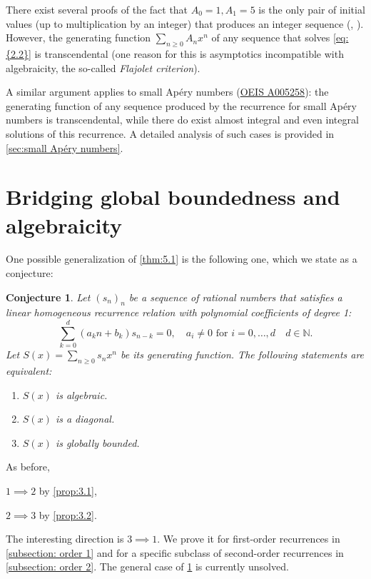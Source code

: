 \documentclass[11pt]{article}
\theoremstyle{definition}
\theoremstyle{plain}
\newtheorem{conj}[defi]{Conjecture}
\theoremstyle{remark}
\begin{document}
There exist several proofs of the fact that $A_0 = 1, A_1 = 5$ is the only pair of initial values (up to multiplication by an integer) that produces an integer sequence (\cite{C84}, \cite{AJ91}). However, the generating function $\sum\limits_{n\geq0}A_nx^n$ of any sequence that solves \eqref{eq:{2.2}} is transcendental (one reason for this is asymptotics incompatible with algebraicity, the so-called \emph{Flajolet criterion}).

A similar argument applies to small Apéry numbers (\href{https://oeis.org/A005258}{OEIS A005258}): the generating function of any sequence produced by the recurrence for small Apéry numbers is transcendental, while there do exist almost integral and even integral solutions of this recurrence. A detailed analysis of such cases is provided in \cref{sec:small Apéry numbers}.

\section{Bridging global boundedness and algebraicity} \label{sec:alg GB}

One possible generalization of \cref{thm:5.1} is the following one, which we state as a conjecture:

\begin{conj}\label{conj:algiffgb}
Let $(s_n)_n$ be a sequence of rational numbers that satisfies a linear homogeneous recurrence relation with polynomial coefficients of degree 1:
\[\sum\limits_{k=0}^{d}(a_kn+b_k)s_{n-k} = 0, \quad a_i \neq 0 \text{ for } i =0,\ldots,d \quad d \in \mathbb{N}.\]
Let $S(x) = \sum\limits_{n\geq0} s_nx^n$ be its generating function. The following statements are equivalent:
\begin{enumerate}
    \item $S(x)$ is algebraic.
    \item $S(x)$ is a diagonal.
    \item $S(x)$ is globally bounded.
\end{enumerate}
\end{conj}

As before, 

$1 \implies 2$ by \cref{prop:3.1}, 

$2 \implies 3$ by \cref{prop:3.2}.

The interesting direction is $3 \implies 1$. We prove it for first-order recurrences in \cref{subsection: order 1} and for a specific subclass of second-order recurrences in \cref{subsection: order 2}. The general case of \cref{conj:algiffgb} is currently unsolved.
\end{document}
